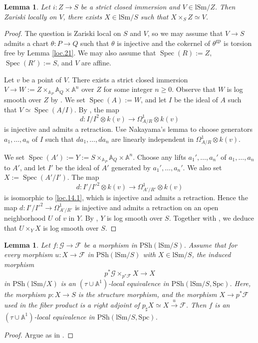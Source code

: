 \documentclass[10pt]{amsart}
\newtheorem{lem}[thm]{Lemma}
\theoremstyle{definition}
\theoremstyle{remark}
\numberwithin{equation}{subsection}
\newcommand{\A}{\mathbb{A}}
\newcommand{\cF}{\mathcal{F}}
\newcommand{\cG}{\mathcal{G}}
\DeclareMathOperator{\Spec}{Spec}
\newcommand{\Psh}{\mathrm{PSh}}
\newcommand{\lSm}{\mathrm{lSm}}
\newcommand{\infPsh}{\mathrm{PSh}}
\newcommand{\Spc}{\mathrm{Spc}}
\newcommand{\gp}{\mathrm{gp}}
\begin{document}
\begin{lem}
\label{loc.14}
Let $i\colon Z\to S$ be a strict closed immersion and $V\in \lSm/Z$.
Then Zariski locally on $V$,
there exists $X\in \lSm/S$ such that $X\times_S Z\simeq V$.
\end{lem}
\begin{proof}
The question is Zariski local on $S$ and $V$, so we may assume that $V\to S$ admits a chart $\theta \colon P\to Q$ such that $\theta$ is injective and the cokernel of $\theta^\gp$ is torsion free by Lemma \ref{loc.21}.
We may also assume that $\Spec(R):=Z$, $\Spec(R'):=S$, and $V$ are affine.

Let $v$ be a point of $V$.
There exists a strict closed immersion $V\to W:=Z\times_{\A_P} \A_Q \times \A^n$ over $Z$ for some integer $n\geq 0$.
Observe that $W$ is log smooth over $Z$ by \cite[Theorem IV.3.1.8]{Ogu}.
We set $\Spec(A):=W$, and let $I$ be the ideal of $A$ such that $V\simeq \Spec(A/I)$.
By \cite[Theorem IV.3.2.2]{Ogu}, the map
\begin{equation}
\label{loc.14.1}
d\colon I/I^2 \otimes k(v)\to \Omega_{A/R}^1\otimes k(v)
\end{equation}
is injective and admits a retraction.
Use Nakayama's lemma to choose generators $a_1,\ldots,a_n$ of $I$ such that $da_1,\ldots,da_n$ are linearly independent in $\Omega_{A/R}^1\otimes k(v)$.

We set $\Spec(A'):=Y:=S\times_{\A_P}\A_Q \times \A^n$.
Choose any lifts $a_1',\ldots,a_n'$ of $a_1,\ldots,a_n$ to $A'$, and let $I'$ be the ideal of $A'$ generated by $a_1',\ldots,a_n'$.
We also set $X:=\Spec(A'/I')$.
The map
\[
d\colon I'/I'^2\otimes k(v)
\to
\Omega_{A'/R'}^1\otimes k(v)
\]
is isomorphic to \eqref{loc.14.1}, which is injective and admits a retraction.
Hence the map $d\colon I'/ I'^2\to \Omega_{A'/R'}^1$ is injective and admits a retraction on an open neighborhood $U$ of $v$ in $Y$.
By \cite[Theorem IV.3.1.8]{Ogu}, $Y$ is log smooth over $S$.
Together with \cite[Theorem IV.3.2.2]{Ogu}, we deduce that $U\times_Y X$ is log smooth over $S$.
\end{proof}




\begin{lem}
\label{loc.7}
Let $f\colon \cG\to \cF$ be a morphism in $\Psh(\lSm/S)$.
Assume that for every morphism $u\colon X\to \cF$ in $\Psh(\lSm/S)$ with $X\in \lSm/S$, the induced morphism
\begin{equation}
\label{loc.7.1}
p^*\cG\times_{p^*\cF}X
\to
X
\end{equation}
in $\Psh(\lSm/X)$ is an $(\tau\cup\A^1)$-local equivalence in $\infPsh(\lSm/S,\Spc)$.
Here, the morphism $p\colon X\to S$ is the structure morphism, and the morphism $X\to p^*\cF$ used in the fiber product is a right adjoint of $p_\sharp X\simeq X\xrightarrow{u}\cF$.
Then $f$ is an $(\tau\cup \A^1)$-local equivalence in $\infPsh(\lSm/S,\Spc)$.
\end{lem}
\begin{proof}
Argue as in \cite[Corollaire 4.5.40]{Ayo072}.
\end{proof}
\end{document}
